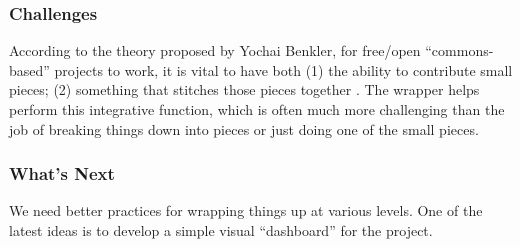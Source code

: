 \subsubsection*{Challenges} According to the theory proposed by Yochai Benkler,
for free/open ``commons-based'' projects to work, it is vital to have
both (1) the ability to contribute small pieces; (2) something that
stitches those pieces together \cite{coases-penguin}. The wrapper helps perform this
integrative function, which is often much more challenging than the job
of breaking things down into pieces or just doing one of the small
pieces.

\subsubsection*{What's Next}
We need better practices for wrapping things up at
various levels.  One of the latest ideas is to develop a simple visual
``dashboard'' for the project.


